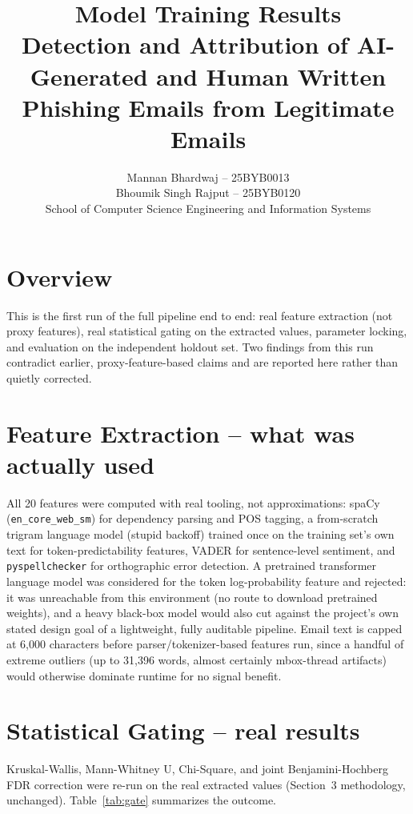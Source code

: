 \documentclass[11pt]{article}
\title{\textbf{Model Training Results}\\[2pt]\large Detection and Attribution of AI-Generated and Human Written
Phishing Emails from Legitimate Emails}
\author{Mannan Bhardwaj -- 25BYB0013 \\ Bhoumik Singh Rajput -- 25BYB0120 \\[4pt]
School of Computer Science Engineering and Information Systems}
\date{}
\begin{document}
\maketitle

\section{Overview}
This is the first run of the full pipeline end to end: real feature extraction (not proxy features),
real statistical gating on the extracted values, parameter locking, and evaluation on the independent
holdout set. Two findings from this run contradict earlier, proxy-feature-based claims and are reported
here rather than quietly corrected.

\section{Feature Extraction -- what was actually used}
All 20 features were computed with real tooling, not approximations: spaCy (\texttt{en\_core\_web\_sm})
for dependency parsing and POS tagging, a from-scratch trigram language model (stupid backoff) trained
once on the training set's own text for token-predictability features, VADER for sentence-level
sentiment, and \texttt{pyspellchecker} for orthographic error detection. A pretrained transformer
language model was considered for the token log-probability feature and rejected: it was unreachable
from this environment (no route to download pretrained weights), and a heavy black-box model would also
cut against the project's own stated design goal of a lightweight, fully auditable pipeline. Email text
is capped at 6{,}000 characters before parser/tokenizer-based features run, since a handful of extreme
outliers (up to 31{,}396 words, almost certainly mbox-thread artifacts) would otherwise dominate runtime
for no signal benefit.

\section{Statistical Gating -- real results}
Kruskal-Wallis, Mann-Whitney U, Chi-Square, and joint Benjamini-Hochberg FDR correction were re-run on
the real extracted values (Section~3 methodology, unchanged). Table~\ref{tab:gate} summarizes the
outcome.
\end{document}
